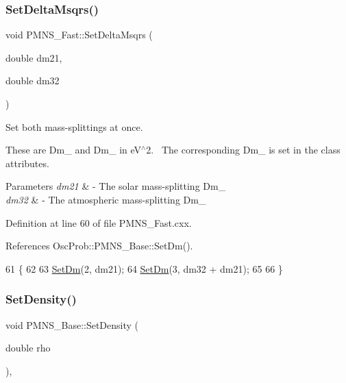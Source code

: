\subsubsection{\texorpdfstring{Set\+Delta\+Msqrs()}{SetDeltaMsqrs()}}
{\footnotesize\ttfamily void P\+M\+N\+S\+\_\+\+Fast\+::\+Set\+Delta\+Msqrs (\begin{DoxyParamCaption}\item[{double}]{dm21,  }\item[{double}]{dm32 }\end{DoxyParamCaption})\hspace{0.3cm}{\ttfamily [virtual]}}

Set both mass-\/splittings at once.

These are Dm\+\_ and Dm\+\_ in e\+V$^\wedge$2.~\newline
The corresponding Dm\+\_ is set in the class attributes.


\begin{DoxyParams}{Parameters}
{\em dm21} & -\/ The solar mass-\/splitting Dm\+\_ \\
\hline
{\em dm32} & -\/ The atmospheric mass-\/splitting Dm\+\_ \\
\hline
\end{DoxyParams}


Definition at line 60 of file P\+M\+N\+S\+\_\+\+Fast.\+cxx.



References Osc\+Prob\+::\+P\+M\+N\+S\+\_\+\+Base\+::\+Set\+Dm().


\begin{DoxyCode}
61 \{
62 
63   \hyperlink{classOscProb_1_1PMNS__Base_a492243b22fb1b783cd2943f507cff970}{SetDm}(2, dm21);
64   \hyperlink{classOscProb_1_1PMNS__Base_a492243b22fb1b783cd2943f507cff970}{SetDm}(3, dm32 + dm21);
65 
66 \}
\end{DoxyCode}
\mbox{\label{classOscProb_1_1PMNS__Base_ac74206f349687da141392c81e2ba6b0d}} 
\subsubsection{\texorpdfstring{Set\+Density()}{SetDensity()}\hspace{0.1cm}{\footnotesize\ttfamily [1/2]}}
{\footnotesize\ttfamily void P\+M\+N\+S\+\_\+\+Base\+::\+Set\+Density (\begin{DoxyParamCaption}\item[{double}]{rho }\end{DoxyParamCaption})\hspace{0.3cm}{\ttfamily [virtual]}, {\ttfamily [inherited]}}

